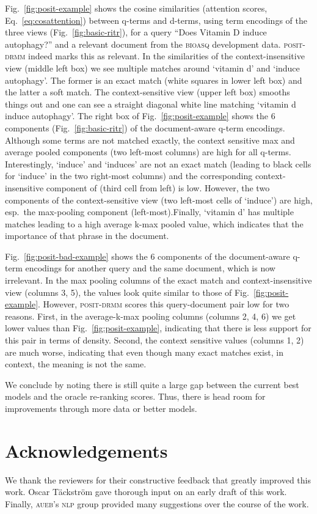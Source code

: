 \documentclass[11pt,a4paper]{article}
\newcommand{\bioasq}{\textsc{bioasq}\xspace}
\newcommand{\positdrmm}{\textsc{posit-drmm}\xspace}
\begin{document}
Fig.~\ref{fig:posit-example} shows the cosine similarities (attention scores, Eq.~\ref{eq:cosattention}) between q-terms and d-terms, using term encodings of the three views (Fig.~\ref{fig:basic-ritr}), for a query ``Does Vitamin D induce 
autophagy?'' and a relevant document from the \bioasq development data. \positdrmm indeed marks this as relevant. In the similarities of the context-insensitive view (middle left box) we see multiple matches around `vitamin d' and `induce autophagy'. The former is an exact match (white squares in lower left box) and the latter a soft match. The context-sensitive view (upper left box) smooths things out and one can see a straight diagonal white line matching `vitamin d induce autophagy'. 
The right box of Fig.~\ref{fig:posit-example} shows the 6 components (Fig.~\ref{fig:basic-ritr}) of the document-aware q-term encodings. Although some terms are not matched exactly, the context sensitive max and average pooled components (two left-most columns) are high for all q-terms. Interestingly, `induce' and `induces' are not an exact match (leading to black cells for `induce' in the two right-most columns) and the corresponding context-insensitive component of (third cell from left) is low. However, the two components of the context-sensitive view (two left-most cells of `induce') are high, esp.\ the max-pooling component (left-most).Finally, `vitamin d' has multiple matches leading to a high average k-max pooled value, which indicates that the importance of that phrase in the document.  

Fig.~\ref{fig:posit-bad-example} shows the 6 components of the document-aware q-term encodings for 
another query and the same document, which is now irrelevant. In the max pooling columns of the exact match and context-insensitive view (columns 3, 5), the values look quite similar to those of Fig.~\ref{fig:posit-example}. However, \positdrmm scores this query-document pair low for two reasons. First, in the average-k-max pooling columns (columns 2, 4, 6) we get 
lower values than Fig.~\ref{fig:posit-example}, indicating that there is less support for this pair in terms of density. Second, the context sensitive values (columns 1, 2) are much worse, indicating that even though many exact matches exist, in context, the meaning is not the same.

We conclude by noting there is still quite a large gap between the current best models and the oracle re-ranking scores. Thus, there is head room for improvements through more data or better models.


\section*{Acknowledgements}
\vspace{-0.1in}
We thank the reviewers for their constructive feedback that greatly improved this work. Oscar T\"{a}ckstr\"{o}m gave thorough input on an early draft of this work. Finally, \textsc{aueb}'s \textsc{nlp} group provided many suggestions over the course of the work.





\end{document}
